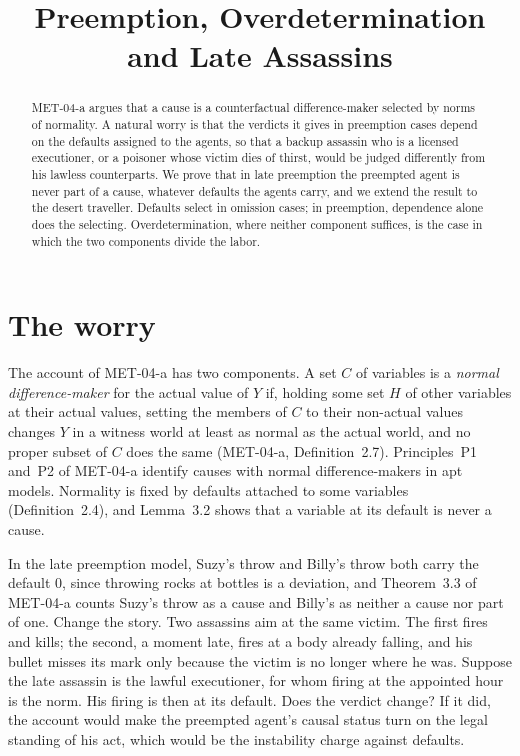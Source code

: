 \documentclass{situationist-preprint}
\title{Preemption, Overdetermination and Late Assassins}
\begin{document}
\maketitle

\begin{abstract}
MET-04-a argues that a cause is a counterfactual difference-maker selected by norms of normality. A natural worry is that the verdicts it gives in preemption cases depend on the defaults assigned to the agents, so that a backup assassin who is a licensed executioner, or a poisoner whose victim dies of thirst, would be judged differently from his lawless counterparts. We prove that in late preemption the preempted agent is never part of a cause, whatever defaults the agents carry, and we extend the result to the desert traveller. Defaults select in omission cases; in preemption, dependence alone does the selecting. Overdetermination, where neither component suffices, is the case in which the two components divide the labor.
\end{abstract}

\section{The worry}

The account of MET-04-a has two components. A set $C$ of variables is a \emph{normal difference-maker} for the actual value of $Y$ if, holding some set $H$ of other variables at their actual values, setting the members of $C$ to their non-actual values changes $Y$ in a witness world at least as normal as the actual world, and no proper subset of $C$ does the same (MET-04-a, Definition~2.7). Principles~P1 and~P2 of MET-04-a identify causes with normal difference-makers in apt models. Normality is fixed by defaults attached to some variables (Definition~2.4), and Lemma~3.2 shows that a variable at its default is never a cause.

In the late preemption model, Suzy's throw and Billy's throw both carry the default $0$, since throwing rocks at bottles is a deviation, and Theorem~3.3 of MET-04-a counts Suzy's throw as a cause and Billy's as neither a cause nor part of one. Change the story. Two assassins aim at the same victim. The first fires and kills; the second, a moment late, fires at a body already falling, and his bullet misses its mark only because the victim is no longer where he was. Suppose the late assassin is the lawful executioner, for whom firing at the appointed hour is the norm. His firing is then at its default. Does the verdict change? If it did, the account would make the preempted agent's causal status turn on the legal standing of his act, which would be the instability \citet{BlanchardSchaffer2017} charge against defaults.
\end{document}
